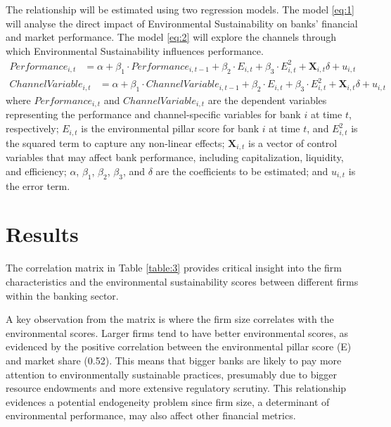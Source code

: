 \documentclass[11pt, a4paper]{article}
\begin{document}
The relationship will be estimated using two regression models. The model \ref{eq:1} will analyse the direct impact of Environmental Sustainability on banks' financial and market performance. The model \ref{eq:2} will explore the channels through which Environmental Sustainability influences performance.
\begin{equation}
\begin{aligned}
    Performance_{i,t} &= \alpha + \beta_1 \cdot Performance_{i,t-1} + \beta_2 \cdot E_{i,t} + \beta_3 \cdot E_{i,t}^2 + \mathbf{X}_{i,t} \delta + u_{i,t}
\end{aligned}
\tag{1}
\label{eq:1}
\end{equation}
\begin{equation}
\begin{aligned}
    ChannelVariable_{i,t} &= \alpha + \beta_1 \cdot ChannelVariable_{i,t-1} + \beta_2 \cdot E_{i,t} + \beta_3 \cdot E_{i,t}^2 + \mathbf{X}_{i,t} \delta + u_{i,t}
\end{aligned}
\tag{2}
\label{eq:2}
\end{equation}
where $Performance_{i,t}$ and $ChannelVariable_{i,t}$ are the dependent variables representing the performance and channel-specific variables for bank $i$ at time $t$, respectively; $E_{i,t}$ is the environmental pillar score for bank $i$ at time $t$, and $E_{i,t}^2$ is the squared term to capture any non-linear effects; $\mathbf{X}_{i,t}$ is a vector of control variables that may affect bank performance, including capitalization, liquidity, and efficiency; $\alpha$, $\beta_1$, $\beta_2$, $\beta_3$, and $\delta$ are the coefficients to be estimated; and $u_{i,t}$ is the error term.

\newpage
\section{Results}
The correlation matrix in Table \ref{table:3} provides critical insight into the firm characteristics and the environmental sustainability scores between different firms within the banking sector. 

A key observation from the matrix is where the firm size correlates with the environmental scores. Larger firms tend to have better environmental scores, as evidenced by the positive correlation between the environmental pillar score (E) and market share (0.52). This means that bigger banks are likely to pay more attention to environmentally sustainable practices, presumably due to bigger resource endowments and more extensive regulatory scrutiny. This relationship evidences a potential endogeneity problem since firm size, a determinant of environmental performance, may also affect other financial metrics.
\end{document}

